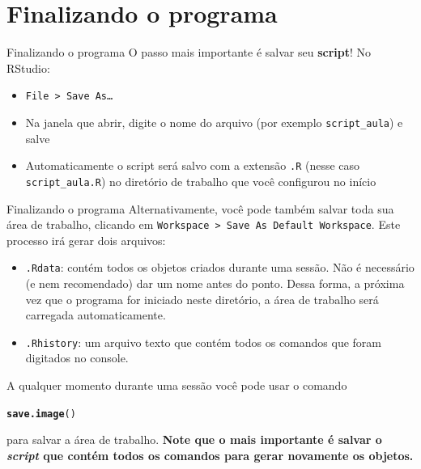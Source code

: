 \documentclass[10pt,handout]{beamer}\usepackage[]{graphicx}\usepackage[]{color}
\makeatletter
\newcommand{\hlstd}[1]{\textcolor[rgb]{0.345,0.345,0.345}{#1}}%
\newcommand{\hlkwd}[1]{\textcolor[rgb]{0.282,0.239,0.545}{\textbf{#1}}}%
\newenvironment{kframe}{%
 \def\at@end@of@kframe{}%
 \ifinner\ifhmode%
  \def\at@end@of@kframe{\end{minipage}}%
  \begin{minipage}{\columnwidth}%
 \fi\fi%
 \def\FrameCommand##1{\hskip\@totalleftmargin \hskip-\fboxsep
 \colorbox{shadecolor}{##1}\hskip-\fboxsep
     \hskip-\linewidth \hskip-\@totalleftmargin \hskip\columnwidth}%
 \MakeFramed {\advance\hsize-\width
   \@totalleftmargin\z@ \linewidth\hsize
   \@setminipage}}%
 {\par\unskip\endMakeFramed%
 \at@end@of@kframe}
\newenvironment{knitrout}{}{} %
\makeatother
\begin{document}
\section{Finalizando o programa}

\begin{frame}[fragile]{Finalizando o programa}
O passo mais importante é salvar seu \textbf{script}! No RStudio:
\begin{itemize}
\item \texttt{File > Save As\ldots}
\item Na janela que abrir, digite o nome do arquivo (por exemplo
  \texttt{script\_aula}) e salve
\item Automaticamente o script será salvo com a extensão \texttt{.R}
  (nesse caso \texttt{script\_aula.R}) no diretório de trabalho que você
  configurou no início
\end{itemize}
\end{frame}

\begin{frame}[fragile]{Finalizando o programa}
Alternativamente, você pode também salvar toda sua área de trabalho,
clicando em \texttt{Workspace > Save As Default Workspace}. Este
processo irá gerar dois arquivos:
\begin{itemize}
\item \texttt{.Rdata}: contém todos os objetos criados durante uma
  sessão. Não é necessário (e nem recomendado) dar um nome antes do
  ponto. Dessa forma, a próxima vez que o programa for iniciado neste
  diretório, a área de trabalho será carregada automaticamente.
\item \texttt{.Rhistory}: um arquivo texto que contém todos os comandos
  que foram digitados no console.
\end{itemize}
A qualquer momento durante uma sessão você pode usar o comando
\begin{knitrout}\small
{}\color{fgcolor}\begin{kframe}
\begin{alltt}
\hlkwd{save.image}\hlstd{()}
\end{alltt}
\end{kframe}
\end{knitrout}

para salvar a área de trabalho. \textbf{Note que o mais importante é salvar o
\emph{script} que contém todos os comandos para gerar novamente os
objetos.}
\end{frame}
\end{document}
